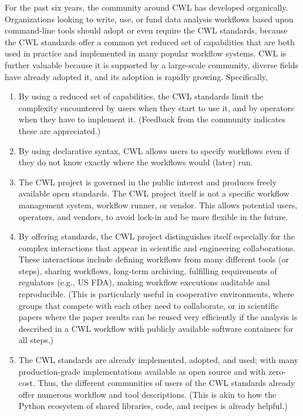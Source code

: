 {{For the past six years, the community around CWL has developed organically. 
Organizations looking to write, use, or fund data analysis workflows based upon command-line tools should adopt or even require the CWL standards, because the CWL standards offer a common yet reduced set of capabilities that are both used in practice and implemented in many popular workflow systems. CWL is further valuable because it is supported by a large-scale community, diverse fields have already adopted it, and its adoption is rapidly growing.
Specifically,
\begin{enumerate}
\item By using a reduced set of capabilities, the CWL standards limit the complexity encountered by users when they start to use it, and by operators when they have to implement it. (Feedback from the community indicates these are appreciated.)
\item By using declarative syntax, CWL allows users to specify workflows even if they do not know exactly where the workflows would (later) run. 
\item The CWL project is governed in the public interest and produces freely available open standards. The CWL project itself is not a specific workflow management system, workflow runner, or vendor. This allows potential users, operators, and vendors, to avoid lock-in and be more flexible in the future.
\item By offering standards, the CWL project distinguishes itself especially for the complex interactions that appear in scientific and engineering collaborations. These interactions include defining workflows from many different tools (or steps), sharing workflows, long-term archiving, fulfilling requirements of regulators (e.g., US FDA), making workflow executions auditable and reproducible. (This is particularly useful in cooperative environments, where groups that compete with each other need to collaborate, or in scientific papers where the paper results can be reused very efficiently if the analysis is described in a CWL workflow with publicly available software containers for all steps.)
\item The CWL standards are already implemented, adopted, and used; with many production-grade implementations available as open source and with zero-cost. Thus, the different communities of users of the CWL standards already offer numerous workflow and tool descriptions. (This is akin to how the Python ecosystem of shared libraries, code, and recipes is already helpful.) 
\end{enumerate}

}}
